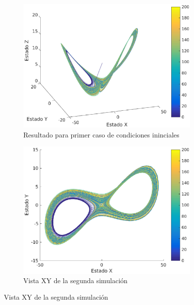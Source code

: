 \documentclass[12pt,letterpaper]{article}
\begin{document}
\begin{figure}
	\centering
	\begin{subfigure}[t]{0.36\textwidth}
		\includegraphics[width=\textwidth]{pictures/segunda_simulacion}
		\caption{Resultado para primer caso de condiciones ininciales}
		\label{fig:simulacion2}
	\end{subfigure}
	\begin{subfigure}[t]{0.36\textwidth}
		\includegraphics[width=\textwidth]{pictures/segunda_simulacion_xy}
		\caption{Vista XY de la segunda simulación}
		\label{fig:simulacion2xy}

\end{subfigure}
\end{figure}
\end{document}

